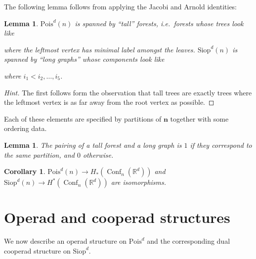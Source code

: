 \documentclass{shortart}
\newtheorem{lemma}[thm]{Lemma}
\newtheorem{cor}[thm]{Corollary}
\theoremstyle{definition}
\DeclareMathOperator\Conf{Conf}
\newcommand\R{\mathbb{R}}
\newcommand\Pois{\mathrm{Pois}}
\newcommand\Siop{\mathrm{Siop}}
\begin{document}
The following lemma follows from applying the Jacobi and Arnold identities:
\begin{lemma}
  $\Pois^d(n)$ is spanned by ``tall'' forests, i.e.\ forests whose trees look like
  \begin{center}
  \end{center}
  where the leftmost vertex has minimal label amongst the leaves. $\Siop^d(n)$ is spanned by ``long graphs'' whose components look like
  \begin{center}
  \end{center}
  where $i_1 < i_2, \ldots, i_5$.
\end{lemma}

\begin{proof}[Hint]
  The first follows form the observation that tall trees are exactly trees where the leftmost vertex is as far away from the root vertex as possible.
\end{proof}

Each of these elements are specified by partitions of $\mathbf{n}$ together with some ordering data.
\begin{lemma}
  The pairing of a tall forest and a long graph is $1$ if they correspond to the same partition, and $0$ otherwise.
\end{lemma}

\begin{cor}
  $\Pois^d(n) \to H_*(\Conf_n(\R^d))$ and $\Siop^d(n) \to H^*(\Conf_n(\R^d))$ are isomorphisms.
\end{cor}

\section{Operad and cooperad structures}
We now describe an operad structure on $\Pois^d$ and the corresponding dual cooperad structure on $\Siop^d$.
\end{document}
